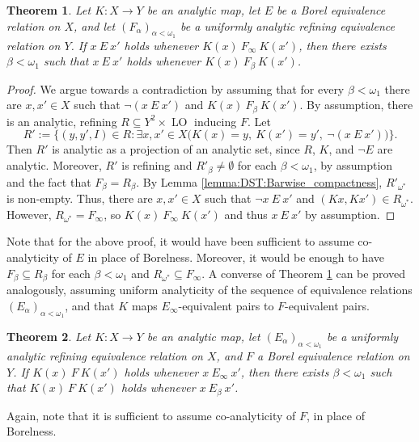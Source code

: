 \documentclass[12pt]{amsart}
\newtheorem{theorem}{Theorem}[section]
\DeclareMathOperator{\LO}{LO}
\begin{document}
\begin{theorem} \label{thm: DST_main}
    Let $K \colon X\to Y$ be an analytic map, let $E$ be a Borel equivalence relation on $X$, and let $(F_\alpha)_{\alpha<\omega_1}$ be a uniformly analytic refining equivalence relation on $Y$. If $x \ E \  x'$ holds whenever $K(x) \ F_\infty \ K(x')$, then there exists $\beta<\omega_1$ such that $x \ E \ x'$ holds whenever $K(x) \ F_{\beta} \ K(x')$.
\end{theorem}
\begin{proof}
    We argue towards a contradiction by assuming that for every $\beta<\omega_1$ there are $x, x' \in X$ such that $\neg (x \ E \ x')$ and $K(x) \ F_\beta \ K(x')$. By assumption, there is an analytic, refining $R\subseteq Y^2\times\LO$ inducing $F$.
    Let
    \[R':=\Big\{(y,y',I)\in R \colon \exists x,x'\in X \big(K(x)=y,~ K(x')=y',~ \neg (x \ E \ x')\big)\Big\}.\]
   Then $R'$ is analytic as a projection of an analytic set, since $R$, $K$, and $\neg E$ are analytic. Moreover, $R'$ is refining and $R'_\beta\neq \emptyset$ for each $\beta<\omega_1$, by assumption and the fact that $F_\beta= R_\beta$. By Lemma \ref{lemma:DST:Barwise_compactness}, $R'_{\omega^*}$ is non-empty. Thus, there are $x, x' \in X$ such that $\neg x \ E \ x'$ and $(Kx, Kx')\in R_{\omega^*}$. However, $R_{\omega^*} = F_{\infty}$, so $K(x) \ F_{\infty} \ K(x')$ and thus $x \ E \ x'$ by assumption.
\end{proof}

Note that for the above proof, it would have been sufficient to assume co-analyticity of $E$ in place of Borelness. Moreover, it would be enough to have $F_\beta\subseteq R_\beta$ for each $\beta<\omega_1$ and $R_{\omega^*}\subseteq F_\infty$.
A converse of Theorem \ref{thm: DST_main} can be proved analogously, assuming uniform analyticity of the sequence of equivalence relations $(E_\alpha)_{\alpha<\omega_1}$, and that $K$ maps $E_\infty$-equivalent pairs to $F$-equivalent pairs.

\begin{theorem} \label{thm: DST_main_2}
    Let $K \colon X\to Y$ be an analytic map, let $(E_\alpha)_{\alpha<\omega_1}$ be a uniformly analytic refining equivalence relation on $X$, and $F$ a Borel equivalence relation on $Y$. If $K(x) \ F \ K(x')$ holds whenever $x \ E_\infty \ x'$, then there exists $\beta<\omega_1$ such that $K(x) \ F \ K(x')$ holds whenever $x \ E_{\beta} \ x'$.
\end{theorem}

Again, note that it is sufficient to assume co-analyticity of $F$, in place of Borelness.
\end{document}
